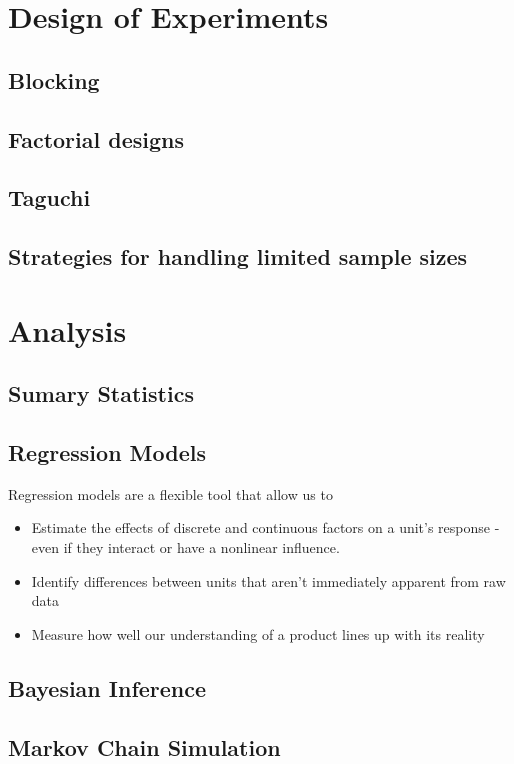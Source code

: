 \documentclass[11pt,a4paper,article]{memoir} %
\begin{document}
\section{Design of Experiments}
\subsection{Blocking}

\subsection{Factorial designs}

\subsection{Taguchi}

\subsection{Strategies for handling limited sample sizes}

\section{Analysis}
\subsection{Sumary Statistics}
\subsection{Regression Models}
Regression models are a flexible tool that allow us to
\begin{itemize}
\item Estimate the effects of discrete and continuous factors on a unit's response - even if they interact or have a nonlinear influence.
\item Identify differences between units that aren't immediately apparent from raw data
\item Measure how well our understanding of a product lines up with its reality
\end{itemize}
\subsection{Bayesian Inference}
\subsection{Markov Chain Simulation}
\end{document}
